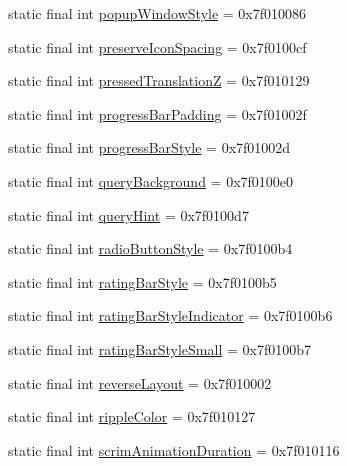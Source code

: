 \begin{CompactItemize}
\item 
static final int \hyperlink{classandroid_1_1support_1_1v4_1_1_r_1_1attr_5fd1b1cc2847c7633535faf12f5a18c3}{popupWindowStyle} = 0x7f010086
\item 
static final int \hyperlink{classandroid_1_1support_1_1v4_1_1_r_1_1attr_bd59f1b367d2346f67d888cb678a7ba0}{preserveIconSpacing} = 0x7f0100cf
\item 
static final int \hyperlink{classandroid_1_1support_1_1v4_1_1_r_1_1attr_b31bcc17b9bb210a371a05ed5a95312b}{pressedTranslationZ} = 0x7f010129
\item 
static final int \hyperlink{classandroid_1_1support_1_1v4_1_1_r_1_1attr_b6fc90421af832b099f14e36bdd5e7d0}{progressBarPadding} = 0x7f01002f
\item 
static final int \hyperlink{classandroid_1_1support_1_1v4_1_1_r_1_1attr_dd9c71af0c85a3754d3f2f883d91f5fd}{progressBarStyle} = 0x7f01002d
\item 
static final int \hyperlink{classandroid_1_1support_1_1v4_1_1_r_1_1attr_c8b580097ef1e35ee6a35e844b838af2}{queryBackground} = 0x7f0100e0
\item 
static final int \hyperlink{classandroid_1_1support_1_1v4_1_1_r_1_1attr_665172d0622865880220861b239f075d}{queryHint} = 0x7f0100d7
\item 
static final int \hyperlink{classandroid_1_1support_1_1v4_1_1_r_1_1attr_6802637ac0463fbbe8f0fb02afa18e76}{radioButtonStyle} = 0x7f0100b4
\item 
static final int \hyperlink{classandroid_1_1support_1_1v4_1_1_r_1_1attr_386384daeadc0061ae532dcde951e29c}{ratingBarStyle} = 0x7f0100b5
\item 
static final int \hyperlink{classandroid_1_1support_1_1v4_1_1_r_1_1attr_3572bdeff819c4eed7b78bad9b83710c}{ratingBarStyleIndicator} = 0x7f0100b6
\item 
static final int \hyperlink{classandroid_1_1support_1_1v4_1_1_r_1_1attr_e8ffd14ba70846a05497362dcca4084e}{ratingBarStyleSmall} = 0x7f0100b7
\item 
static final int \hyperlink{classandroid_1_1support_1_1v4_1_1_r_1_1attr_c43127a3f9ec7199e97e07462835c6e3}{reverseLayout} = 0x7f010002
\item 
static final int \hyperlink{classandroid_1_1support_1_1v4_1_1_r_1_1attr_008191cd3ac318fc96837e516c666129}{rippleColor} = 0x7f010127
\item 
static final int \hyperlink{classandroid_1_1support_1_1v4_1_1_r_1_1attr_5fd60b7720c2aedd7a0db3475e6b12b8}{scrimAnimationDuration} = 0x7f010116
\item 

\end{CompactItemize}
